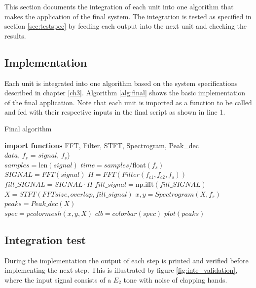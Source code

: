 This section documents the integration of each unit into one algorithm that makes the application of the final system. The integration is tested as specified in section \ref{sec:testspec} by feeding each output into the next unit and checking the results. 

\subsection{Implementation}
Each unit is integrated into one algorithm based on the system specifications described in chapter \ref{ch3}. Algorithm \ref{alg:final} shows the basic implementation of the final application. Note that each unit is imported as a function to be called and fed with their respective inputs in the final script as shown in line 1.
\begin{algorithm}[H]
\caption{Final algorithm}
\begin{algorithmic}[1]
\State \textbf{import functions} FFT, Filter, STFT, Spectrogram, Peak\_dec  
\\
\State $data$, $f_s$ = $signal$, $f_s$) 
\EndProcedure 
\\
\State $samples = $len$(signal)$ 
\State $time   = samples/$float$(f_s)$
\\
\State $SIGNAL = FFT(signal) $
\State $H = FFT(Filter(f_{c1},f_{c2},f_s))$
\State $filt\_SIGNAL = SIGNAL \cdot H$
\State $filt\_signal = $np.ifft$(filt\_SIGNAL)$
\EndProcedure 
\\
\State $X = STFT(FFTsize,overlap,filt\_signal)$
\State $x,y = Spectrogram(X,f_s)$
\State $peaks = Peak\_dec(X)$
\EndProcedure
\\
\State $spec=pcolormesh(x,y,X)$ 
\State $clb = colorbar(spec)$
\State $plot(peaks)$
\EndProcedure
\end{algorithmic}
\label{alg:final}
\end{algorithm}          

\subsection{Integration test}
During the implementation the output of each step is printed and verified before implementing the next step. This is illustrated by figure \ref{fig:inte_validation}, where the input signal consists of a $E_2$ tone with noise of clapping hands.

